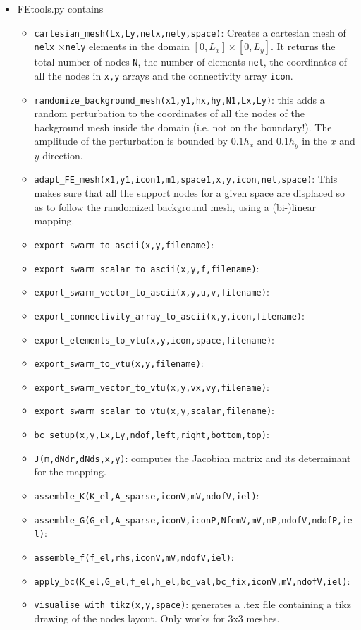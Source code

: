 \begin{itemize}
\item {\pythonfile FEtools.py} contains

\begin{itemize}
\item \lstinline{cartesian_mesh(Lx,Ly,nelx,nely,space)}: Creates a cartesian mesh of \lstinline{nelx}
$\times$\lstinline{nely} elements in the domain $[0,L_x]\times[0,L_y]$. It returns the total 
number of nodes \lstinline{N}, the number of elements \lstinline{nel}, the coordinates of all the 
nodes in \lstinline{x,y} arrays and the connectivity array \lstinline{icon}.
\item \lstinline{randomize_background_mesh(x1,y1,hx,hy,N1,Lx,Ly)}: this adds a random perturbation
to the coordinates of all the nodes of the background mesh inside the domain (i.e. not on the boundary!). 
The amplitude of the perturbation is bounded by $0.1h_x$ and $0.1h_y$ in the $x$ and $y$ direction.
\item \lstinline{adapt_FE_mesh(x1,y1,icon1,m1,space1,x,y,icon,nel,space)}: This makes sure that 
all the support nodes for a given space are displaced so as to follow the randomized 
background mesh, using a (bi-)linear mapping.

\item \lstinline{export_swarm_to_ascii(x,y,filename)}:
\item \lstinline{export_swarm_scalar_to_ascii(x,y,f,filename)}:
\item \lstinline{export_swarm_vector_to_ascii(x,y,u,v,filename)}:
\item \lstinline{export_connectivity_array_to_ascii(x,y,icon,filename)}:
\item \lstinline{export_elements_to_vtu(x,y,icon,space,filename)}:
\item \lstinline{export_swarm_to_vtu(x,y,filename)}:
\item \lstinline{export_swarm_vector_to_vtu(x,y,vx,vy,filename)}:
\item \lstinline{export_swarm_scalar_to_vtu(x,y,scalar,filename)}:
\item \lstinline{bc_setup(x,y,Lx,Ly,ndof,left,right,bottom,top)}:
\item \lstinline{J(m,dNdr,dNds,x,y)}: computes the Jacobian matrix and its determinant 
for the mapping. 
\item \lstinline{assemble_K(K_el,A_sparse,iconV,mV,ndofV,iel)}:
\item \lstinline{assemble_G(G_el,A_sparse,iconV,iconP,NfemV,mV,mP,ndofV,ndofP,iel)}:
\item \lstinline{assemble_f(f_el,rhs,iconV,mV,ndofV,iel)}:
\item \lstinline{apply_bc(K_el,G_el,f_el,h_el,bc_val,bc_fix,iconV,mV,ndofV,iel)}:
\item \lstinline{visualise_with_tikz(x,y,space)}: generates a .tex file containing 
a tikz drawing of the nodes layout. Only works for 3x3 meshes. 
\end{itemize}

\end{itemize}

